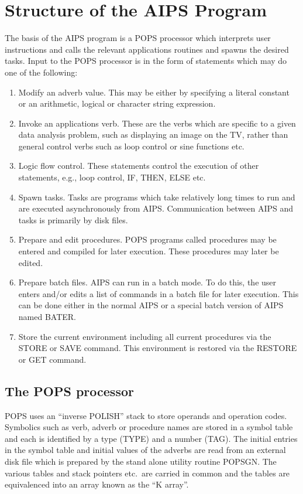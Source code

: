 \section{Structure of the AIPS Program}
 The basis of the AIPS program is a POPS processor which interprets
user instructions and calls the relevant applications routines and
spawns the desired tasks.  Input to the POPS processor is in the form
of statements which may do one of the following:
\begin{enumerate} %
\item Modify an adverb value.  This may be either by specifying a literal
constant or an arithmetic, logical or character string expression.
\item Invoke an applications verb.  These are the verbs which are specific
to a given data analysis problem, such as displaying an image on the
TV, rather than general control verbs such as loop control or sine
functions etc.
\item Logic flow control.  These statements control the execution of other
statements, e.g., loop control, IF, THEN, ELSE etc.
\item Spawn tasks.  Tasks are programs which take relatively long times to
run and are executed asynchronously from AIPS.  Communication between
AIPS and tasks is primarily by disk files.
\item Prepare and edit procedures.  POPS programs called procedures may be
entered and compiled for later execution.  These procedures may later
be edited.
\item Prepare batch files.  AIPS can run in a batch mode.  To do this, the
user enters and/or edits a list of commands in a batch file for later
execution. This can be done either in the normal AIPS or a special
batch version of AIPS named BATER.
\item Store the current environment including all current procedures
via the STORE or SAVE command.  This environment is restored via the
RESTORE or GET command.
\end{enumerate} %
 

\subsection{The POPS processor}
POPS uses an ``inverse POLISH'' stack to store operands and operation
codes. Symbolics such as verb, adverb or procedure names are stored in
a symbol table and each is identified by a type (TYPE) and a number
(TAG).  The initial entries in the symbol table and initial values of
the adverbs are read from an external disk file which is prepared by
the stand alone utility routine POPSGN.  The various tables and stack
pointers etc.~are carried in common and the tables are equivalenced
into an array known as the ``K array''.

